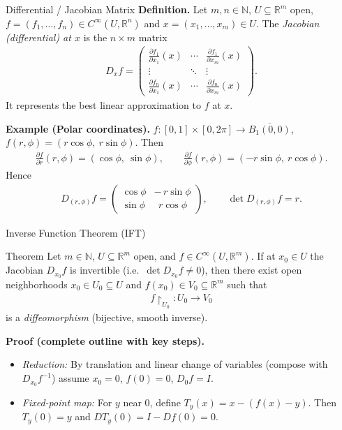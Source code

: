 \begin{frame}{Differential / Jacobian Matrix}
\textbf{Definition.} Let $m,n\in\mathbb{N}$, $U\subseteq\mathbb{R}^m$ open, $f=(f_1,\dots,f_n)\in C^\infty(U,\mathbb{R}^n)$ and $x=(x_1,\dots,x_m)\in U$.
The \emph{Jacobian (differential) at $x$} is the $n\times m$ matrix
\begin{align*}
D_x f
=\begin{pmatrix}
\frac{\partial f_1}{\partial x_1}(x) & \cdots & \frac{\partial f_1}{\partial x_m}(x)\\
\vdots & \ddots & \vdots\\
\frac{\partial f_n}{\partial x_1}(x) & \cdots & \frac{\partial f_n}{\partial x_m}(x)
\end{pmatrix}.
\end{align*}
It represents the best linear approximation to $f$ at $x$.

\textbf{Example (Polar coordinates).} $f:[0,1]\times[0,2\pi]\to \overline{B_1(0,0)}$, $f(r,\phi)=(r\cos\phi,\ r\sin\phi)$. Then
\begin{align*}
\frac{\partial f}{\partial r}(r,\phi)=(\cos\phi,\ \sin\phi),\qquad
\frac{\partial f}{\partial \phi}(r,\phi)=(-r\sin\phi,\ r\cos\phi).
\end{align*}
Hence
\begin{align*}
D_{(r,\phi)} f
=\begin{pmatrix}
\cos\phi & -\,r\sin\phi\\
\sin\phi & \ \ r\cos\phi
\end{pmatrix},\qquad
\det D_{(r,\phi)} f = r.
\end{align*}
\end{frame}

\begin{frame}{Inverse Function Theorem (IFT)}
\vspace{-0.3cm}
\begin{block}{Theorem}
Let $m\in\mathbb{N}$, $U\subseteq\mathbb{R}^m$ open, and $f\in C^\infty(U,\mathbb{R}^m)$.
If at $x_0\in U$ the Jacobian $D_{x_0}f$ is invertible (i.e.\ $\det D_{x_0}f\neq 0$), then there exist open neighborhoods $x_0\in U_0\subseteq U$ and $f(x_0)\in V_0\subseteq\mathbb{R}^m$ such that
\begin{align*}
f\!\restriction_{U_0}:U_0\to V_0
\end{align*}
is a \emph{diffeomorphism} (bijective, smooth inverse).

\end{block}

\textbf{Proof (complete outline with key steps).}
\begin{itemize}
\item \emph{Reduction:} By translation and linear change of variables (compose with $D_{x_0}f^{-1}$) assume $x_0=0$, $f(0)=0$, $D_0 f = I$.
\item \emph{Fixed-point map:} For $y$ near $0$, define $T_y(x)=x-(f(x)-y)$. Then $T_y(0)=y$ and $D T_y(0)=I-D f(0)=0$.
\end{itemize}
\end{frame}

